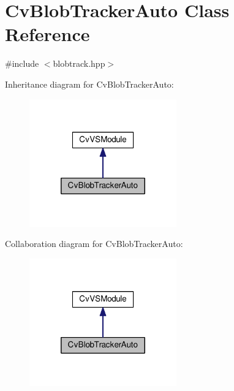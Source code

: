 \hypertarget{classCvBlobTrackerAuto}{\section{Cv\-Blob\-Tracker\-Auto Class Reference}
\label{classCvBlobTrackerAuto}
}


{\ttfamily \#include $<$blobtrack.\-hpp$>$}



Inheritance diagram for Cv\-Blob\-Tracker\-Auto\-:\nopagebreak
\begin{figure}[H]
\begin{center}
\leavevmode
\includegraphics[width=180pt]{classCvBlobTrackerAuto__inherit__graph}
\end{center}
\end{figure}


Collaboration diagram for Cv\-Blob\-Tracker\-Auto\-:\nopagebreak
\begin{figure}[H]
\begin{center}
\leavevmode
\includegraphics[width=180pt]{classCvBlobTrackerAuto__coll__graph}
\end{center}
\end{figure}
